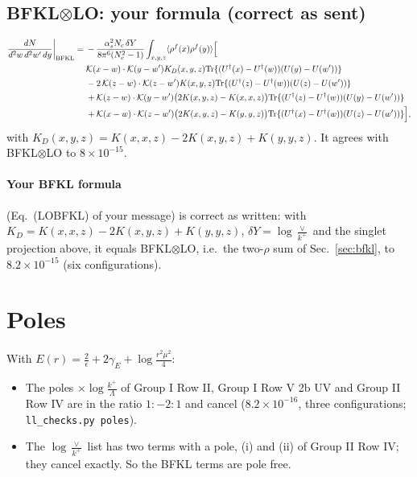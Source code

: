 \documentclass[10pt]{article}
\numberwithin{equation}{section}
\begin{document}
\subsection{BFKL$\otimes$LO: your formula (correct as sent)}
\begin{align}
\frac{dN}{d^2w\,d^2w'\,dy}\bigg|_{\rm BFKL}={}&-\frac{\alpha_s^2N_c\,\delta Y}{8\pi^6(N_c^2-1)}\int_{x,y,z}\langle\rho^f(x)\rho^f(y)\rangle\Big[\notag\\
&\mathcal K(x-w)\cdot\mathcal K(y-w')K_D(x,y,z){\rm Tr}\{(U^\dagger(x)-U^\dagger(w))(U(y)-U(w'))\}\notag\\
&-2\,\mathcal K(z-w)\cdot\mathcal K(z-w')K(x,y,z){\rm Tr}\{(U^\dagger(z)-U^\dagger(w))(U(z)-U(w'))\}\notag\\
&+\mathcal K(z-w)\cdot\mathcal K(y-w')\big(2K(x,y,z)-K(x,x,z)\big){\rm Tr}\{(U^\dagger(z)-U^\dagger(w))(U(y)-U(w'))\}\notag\\
&+\mathcal K(x-w)\cdot\mathcal K(z-w')\big(2K(x,y,z)-K(y,y,z)\big){\rm Tr}\{(U^\dagger(x)-U^\dagger(w))(U(z)-U(w'))\}\Big],
\label{eq:BFKL}
\end{align}
with $K_D(x,y,z)=K(x,x,z)-2K(x,y,z)+K(y,y,z)$. It agrees with BFKL$\otimes$LO to $8\times10^{-15}$.


\paragraph{Your BFKL formula} (Eq.~(LOBFKL) of your message) is correct as written: with $K_D=K(x,x,z)-2K(x,y,z)+K(y,y,z)$, $\delta Y=\log\frac{\vee}{k^+}$ and the singlet projection above, it equals BFKL$\otimes$LO, i.e.\ the two-$\rho$ sum of Sec.~\ref{sec:bfkl}, to $8.2\times10^{-15}$ (six configurations).

\section{Poles}\label{sec:poles}
With $E(r)=\frac{2}{\epsilon}+2\gamma_E+\log\frac{r^2\mu^2}{4}$:
\begin{itemize}
\item The poles $\times\log\frac{k^+}{\Lambda}$ of Group I Row II, Group I Row V 2b UV and Group II Row IV are in the ratio $1:-2:1$ and cancel ($8.2\times10^{-16}$, three configurations; \texttt{ll\_checks.py poles}).
\item The $\log\frac{\vee}{k^+}$ list has two terms with a pole, (i) and (ii) of Group II Row IV; they cancel exactly. So the BFKL terms are pole free.
\end{itemize}
\end{document}

